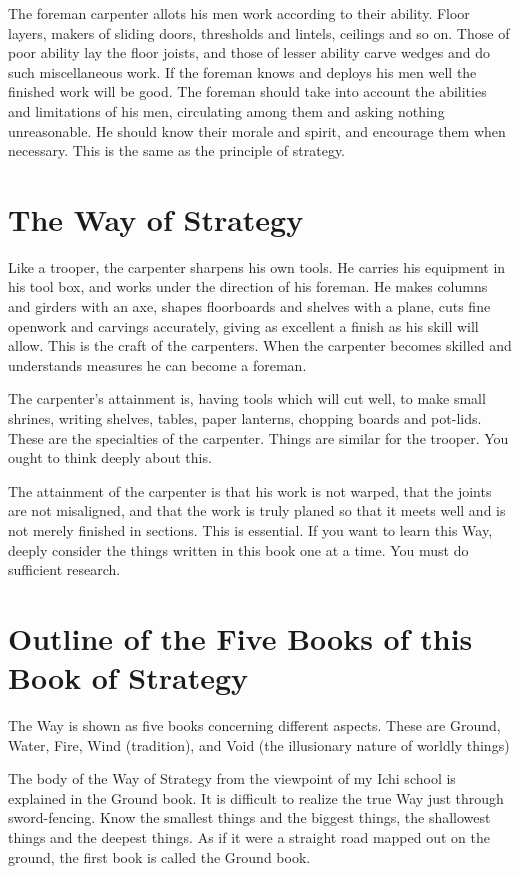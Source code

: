 \documentclass[12pt]{report}
\begin{document}
The foreman carpenter allots his men work according to their ability. Floor layers, makers of sliding doors, thresholds and lintels, ceilings and so on. Those of poor ability lay the floor joists, and those of lesser ability carve wedges and do such miscellaneous work. If the foreman knows and deploys his men well the finished work will be good. The foreman should take into account the abilities and limitations of his men, circulating among them and asking nothing unreasonable. He should know their morale and spirit, and encourage them when necessary. This is the same as the principle of strategy.
\clearpage
\section*{The Way of Strategy}
Like a trooper, the carpenter sharpens his own tools. He carries his equipment in his tool box, and works under the direction of his foreman. He makes columns and girders with an axe, shapes floorboards and shelves with a plane, cuts fine openwork and carvings accurately, giving as excellent a finish as his skill will allow. This is the craft of the carpenters. When the carpenter becomes skilled and understands measures he can become a foreman.

The carpenter's attainment is, having tools which will cut well, to make small shrines, writing shelves, tables, paper lanterns, chopping boards and pot-lids. These are the specialties of the carpenter. Things are similar for the trooper. You ought to think deeply about this.

The attainment of the carpenter is that his work is not warped, that the joints are not misaligned, and that the work is truly planed so that it meets well and is not merely finished in sections. This is essential. If you want to learn this Way, deeply consider the things written in this book one at a time. You must do sufficient research.
\section*{Outline of the Five Books of this Book of Strategy}
The Way is shown as five books concerning different aspects. These are Ground, Water, Fire, Wind (tradition), and Void (the illusionary nature of worldly things)

The body of the Way of Strategy from the viewpoint of my Ichi school is explained in the Ground book. It is difficult to realize the true Way just through sword-fencing. Know the smallest things and the biggest things, the shallowest things and the deepest things. As if it were a straight road mapped out on the ground, the first book is called the Ground book.
\end{document}
